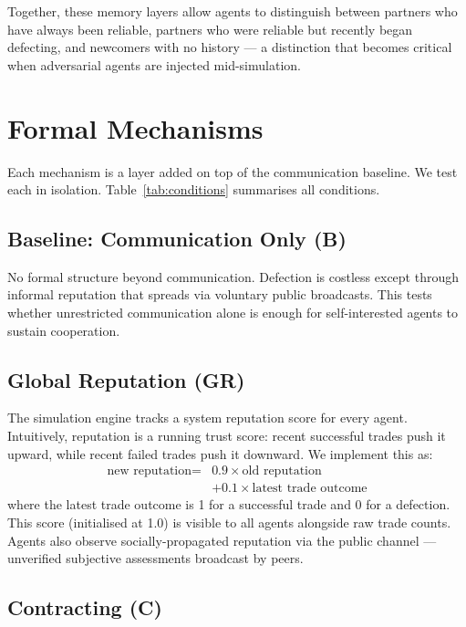 \documentclass{article}
\begin{document}
Together, these memory layers allow agents to distinguish between partners who have always been reliable, partners who were reliable but recently began defecting, and newcomers with no history --- a distinction that becomes critical when adversarial agents are injected mid-simulation.

\section{Formal Mechanisms}
\label{sec:mechanisms}

Each mechanism is a layer added on top of the communication baseline. We test each in isolation. Table~\ref{tab:conditions} summarises all conditions.

\subsection{Baseline: Communication Only (B)}

No formal structure beyond communication. Defection is costless except through informal reputation that spreads via voluntary public broadcasts. This tests whether unrestricted communication alone is enough for self-interested agents to sustain cooperation.

\subsection{Global Reputation (GR)}

The simulation engine tracks a system reputation score for every agent. Intuitively, reputation is a running trust score: recent successful trades push it upward, while recent failed trades push it downward. We implement this as:
\[
\begin{aligned}
\text{new reputation} ={}& 0.9 \times \text{old reputation} \\
&+ 0.1 \times \text{latest trade outcome}
\end{aligned}
\]
where the latest trade outcome is 1 for a successful trade and 0 for a defection. This score (initialised at 1.0) is visible to all agents alongside raw trade counts. Agents also observe socially-propagated reputation via the public channel --- unverified subjective assessments broadcast by peers.

\subsection{Contracting (C)}
\end{document}
